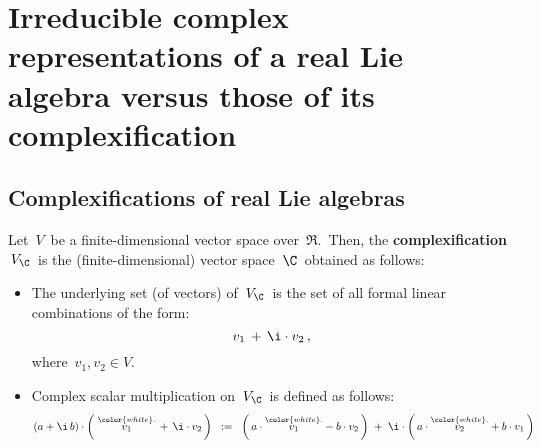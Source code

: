 

\chapter{Irreducible complex representations of a real Lie algebra versus those of its complexification}
\setcounter{theorem}{0}
\setcounter{equation}{0}


\renewcommand{\theenumi}{\roman{enumi}}
\renewcommand{\labelenumi}{\textnormal{(\theenumi)}$\;\;$}


\section{Complexifications of real Lie algebras}

\begin{definition}
\mbox{}
\vskip 0.05cm
\noindent
Let \,$V$\, be a finite-dimensional vector space over \,$\Re$.\,
Then, the \textbf{complexification} \,$V_{\C}$\, is
the (finite-dimensional) vector space \,$\C$\, obtained as follows:
\begin{itemize}
\item
	The underlying set (of vectors) of \,$V_{\C}$\, is the set of all formal linear combinations
	of the form:
	\begin{equation*}
	v_{1} \, + \, \i\cdot v_{2}\,,
	\end{equation*}
	where \,$v_{1}, v_{2} \in V$.\,
\item
	Complex scalar multiplication on \,$V_{\C}$\, is defined as follows:
	\begin{equation*}
	(a + \i \, b) \cdot \left(\;\overset{{\color{white}.}}{v_{1}} \, + \, \i\cdot v_{2}\,\right)
	\;\; := \;\;
		\left(\,a\cdot\overset{{\color{white}.}}{v_{1}} - b \cdot v_{2} \,\right)
		\; + \;
		\i\cdot\left(\,a\cdot\overset{{\color{white}.}}{v_{2}} + b \cdot v_{1} \,\right)
	\end{equation*}	
\end{itemize}
\end{definition}


